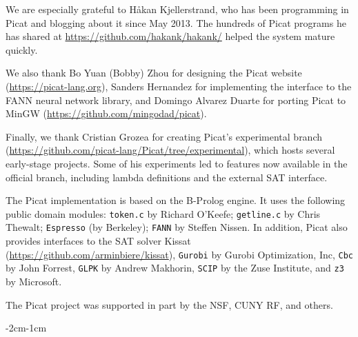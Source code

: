 \documentclass[11pt]{report}
\newcommand{\ignore}[1]{}
\begin{document}
We are especially grateful to H{\aa}kan Kjellerstrand, who has been programming in Picat and blogging about it since May 2013. The hundreds of Picat programs he has shared at \url{https://github.com/hakank/hakank/} helped the system mature quickly.

We also thank Bo Yuan (Bobby) Zhou for designing the Picat website (\url{https://picat-lang.org}), Sanders Hernandez for implementing the interface to the FANN neural network library, and Domingo Alvarez Duarte for porting Picat to MinGW (\url{https://github.com/mingodad/picat}).

Finally, we thank Cristian Grozea for creating Picat's experimental branch (\url{https://github.com/picat-lang/Picat/tree/experimental}), which hosts several early-stage projects. Some of his experiments led to features now available in the official branch, including lambda definitions and the external SAT interface.

The Picat implementation is based on the B-Prolog engine. It uses the following public domain modules: \ignore{\texttt{prism} by Taisuke Sato and Yoshitaka Kameya; }\texttt{token.c} by Richard O'Keefe; \texttt{getline.c} by Chris Thewalt; \texttt{Espresso} (by Berkeley); \texttt{FANN} by Steffen Nissen. In addition, Picat also provides interfaces to the SAT solver Kissat (\url{https://github.com/arminbiere/kissat}), \texttt{Gurobi} by Gurobi Optimization, Inc, \texttt{Cbc} by John Forrest, \texttt{GLPK} by Andrew Makhorin, \texttt{SCIP} by the Zuse Institute, and \texttt{z3} by Microsoft.

The Picat project was supported in part by the NSF, CUNY RF, and others. %

\tableofcontents

\cleardoublepage
\pagestyle{plain}
\setcounter{page}{1}


























\begin{adjustwidth}{-2cm}{-1cm}

\end{adjustwidth}
\clearpage
{}
{}
\printindex
\end{document}

